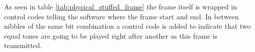	As seen in table \ref{tab:physical_stuffed_frame} the frame itself is wrapped in control codes telling the software where
	the frame start and end. In between nibbles of the same bit combination a control code is added to indicate that two equal
	tones are going to be played right after another as this frame is transmitted.